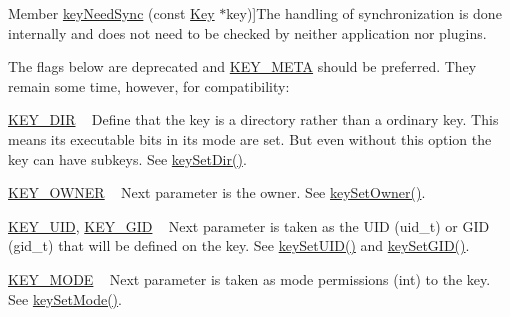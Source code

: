 \begin{DoxyRefList}
%
Member \hyperlink{group__keytest_gaf247df0de7aca04b32ef80e39ef12950}{key\+Need\+Sync} (const \hyperlink{classkdb_1_1Key}{Key} $\ast$key)]The handling of synchronization is done internally and does not need to be checked by neither application nor plugins. 
\item[\label{deprecated__deprecated000010}%
\Hypertarget{deprecated__deprecated000010}%
Member \hyperlink{group__key_gad23c65b44bf48d773759e1f9a4d43b89}{key\+New} (const char $\ast$name,...)]The flags below are deprecated and \hyperlink{group__key_gga91fb3178848bd682000958089abbaf40a040582834bb2d90049947d7ef74e87e2}{K\+E\+Y\+\_\+\+M\+E\+TA} should be preferred. They remain some time, however, for compatibility\+:
\begin{DoxyItemize}
\item \hyperlink{group__key_gga91fb3178848bd682000958089abbaf40a9e43e47c8a21478538e2d20e049981d5}{K\+E\+Y\+\_\+\+D\+IR} ~\newline
 Define that the key is a directory rather than a ordinary key. This means its executable bits in its mode are set. But even without this option the key can have subkeys. See \hyperlink{group__meta_gaae575bd86a628a15ee45baa860522e75}{key\+Set\+Dir()}.
\item \hyperlink{group__key_gga91fb3178848bd682000958089abbaf40a77ca60362fa8daca8d5347db4385068b}{K\+E\+Y\+\_\+\+O\+W\+N\+ER} ~\newline
 Next parameter is the owner. See \hyperlink{owner_8c_a88d6ec200ba0707b7c1b4a88133d2be4}{key\+Set\+Owner()}.
\item \hyperlink{group__key_gga91fb3178848bd682000958089abbaf40a28f01a87d65f065172f734c9c9446c0e}{K\+E\+Y\+\_\+\+U\+ID}, \hyperlink{group__key_gga91fb3178848bd682000958089abbaf40ac0628bbaba7c837ca73323681393d15f}{K\+E\+Y\+\_\+\+G\+ID} ~\newline
 Next parameter is taken as the U\+ID (uid\+\_\+t) or G\+ID (gid\+\_\+t) that will be defined on the key. See \hyperlink{group__meta_gab5f284f5ecd261e0a290095f50ba1af7}{key\+Set\+U\+I\+D()} and \hyperlink{group__meta_ga9e3d0fb3f7ba906e067727b9155d22e3}{key\+Set\+G\+I\+D()}.
\item \hyperlink{group__key_gga91fb3178848bd682000958089abbaf40a1b0a91ff3a855d6993930ebf0abaa518}{K\+E\+Y\+\_\+\+M\+O\+DE} ~\newline
 Next parameter is taken as mode permissions (int) to the key. See \hyperlink{group__meta_ga8803037e35b9da1ce492323a88ff6bc3}{key\+Set\+Mode()}. 
\begin{DoxyCodeInclude}

\end{DoxyCodeInclude}
\end{DoxyItemize}
\end{DoxyRefList}
